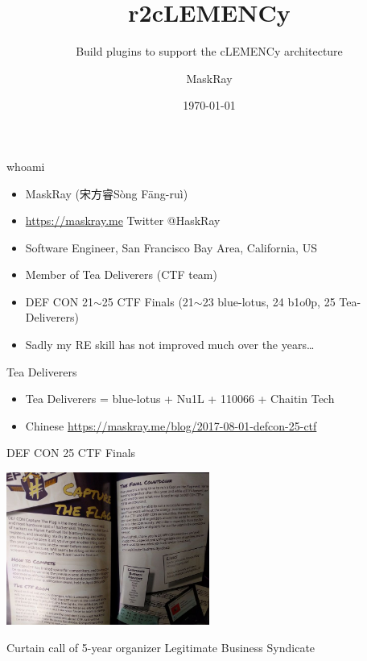 \documentclass{beamer}
\title{r2cLEMENCy}
\subtitle{Build plugins to support the cLEMENCy architecture}
\date{\today}
\author[maskray]{MaskRay}
\institute{r2con 2017}
\begin{document}
\maketitle

\begin{frame}{whoami}
  \begin{itemize}
  \item MaskRay (\ifxetex 宋方睿\fi Sòng Fāng-ruì)
  \item \url{https://maskray.me} Twitter @HaskRay
  \item Software Engineer, San Francisco Bay Area, California, US
  \item Member of \alert{Tea Deliverers} (CTF team)
  \item DEF CON 21$\sim$25 CTF Finals (21$\sim$23 blue-lotus, 24 b1o0p, 25 Tea-Deliverers)
  \item Sadly my RE skill has not improved much over the years\ldots
  \end{itemize}
\end{frame}

\begin{frame}{Tea Deliverers}
  \begin{itemize}
  \item Tea Deliverers = blue-lotus + Nu1L + 110066 + Chaitin Tech
  \item Chinese \url{https://maskray.me/blog/2017-08-01-defcon-25-ctf}
  \end{itemize}
\end{frame}

\begin{frame}{DEF CON 25 CTF Finals}
  \begin{center}
    \includegraphics[height=5cm]{defcon-ctf.jpg}
  \end{center}
  \begin{center}
    Curtain call of 5-year organizer Legitimate Business Syndicate
  \end{center}
\end{frame}
\end{document}
